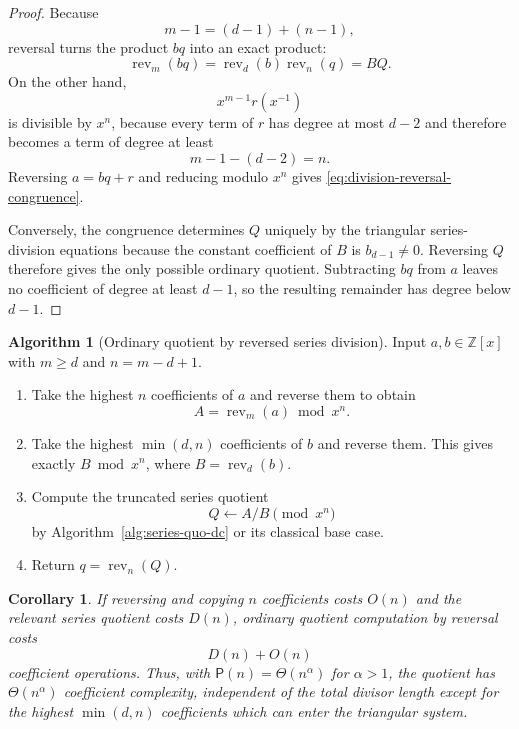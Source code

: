 \documentclass[11pt]{book}
\newtheorem{corollary}[theorem]{Corollary}
\theoremstyle{definition}
\newtheorem{algorithm}[theorem]{Algorithm}
\newcommand{\ZZ}{\mathbb Z}
\begin{document}
\begin{proof}
Because
\[
 m-1=(d-1)+(n-1),
\]
reversal turns the product $bq$ into an exact product:
\[
 \operatorname{rev}_m(bq)
 =\operatorname{rev}_d(b)\operatorname{rev}_n(q)=BQ.
\]
On the other hand,
\[
 x^{m-1}r(x^{-1})
\]
is divisible by $x^n$, because every term of $r$ has degree at most $d-2$ and
therefore becomes a term of degree at least
\[
 m-1-(d-2)=n.
\]
Reversing $a=bq+r$ and reducing modulo $x^n$ gives
\eqref{eq:division-reversal-congruence}.

Conversely, the congruence determines $Q$ uniquely by the triangular
series-division equations because the constant coefficient of $B$ is
$b_{d-1}\ne0$.  Reversing $Q$ therefore gives the only possible ordinary
quotient.  Subtracting $bq$ from $a$ leaves no coefficient of degree at least
$d-1$, so the resulting remainder has degree below $d-1$.
\end{proof}

\begin{algorithm}[Ordinary quotient by reversed series division]\label{alg:quotient-reversal}
Input $a,b\in\ZZ[x]$ with $m\geq d$ and $n=m-d+1$.
\begin{enumerate}
 \item Take the highest $n$ coefficients of $a$ and reverse them to obtain
 \[
  A=\operatorname{rev}_m(a)\bmod x^n.
 \]
 \item Take the highest $\min(d,n)$ coefficients of $b$ and reverse them.
 This gives exactly $B\bmod x^n$, where $B=\operatorname{rev}_d(b)$.
 \item Compute the truncated series quotient
 \[
  Q\leftarrow A/B\pmod{x^n}
 \]
 by Algorithm~\ref{alg:series-quo-dc} or its classical base case.
 \item Return $q=\operatorname{rev}_n(Q)$.
\end{enumerate}
\end{algorithm}

\begin{corollary}\label{cor:quotient-reversal-complexity}
If reversing and copying $n$ coefficients costs $O(n)$ and the relevant
series quotient costs $D(n)$, ordinary quotient computation by reversal costs
\[
 D(n)+O(n)
\]
coefficient operations.  Thus, with
$\mathsf P(n)=\Theta(n^\alpha)$ for $\alpha>1$, the quotient has
$\Theta(n^\alpha)$ coefficient complexity, independent of the total divisor
length except for the highest $\min(d,n)$ coefficients which can enter the
triangular system.
\end{corollary}
\end{document}
